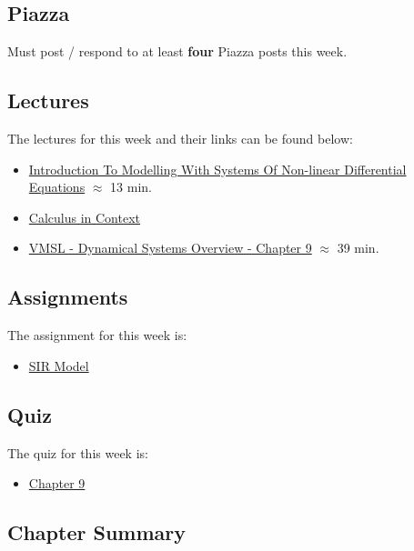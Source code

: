 \subsection{Piazza}

Must post / respond to at least \textbf{four} Piazza posts this week.

\subsection{Lectures}

The lectures for this week and their links can be found below:

\begin{itemize}
    \item \href{https://applied.cs.colorado.edu/mod/hvp/view.php?id=50773}{Introduction To Modelling With Systems Of Non-linear Differential Equations} $\approx$ 13 min.
    \item \href{https://scholarworks.smith.edu/textbooks/2/}{Calculus in Context}
    \item \href{https://www.youtube.com/watch?v=NS0jvPLtgGc}{VMSL - Dynamical Systems Overview - Chapter 9} $\approx$ 39 min.
\end{itemize}

\subsection{Assignments}

The assignment for this week is:

\begin{itemize}
    \item \href{https://github.com/QuantumCompiler/CU/tree/main/CSPB%202820%20-%20Linear%20Algebra%20With%20Computer%20Science%20Applications/CSPB%202820%20-%20Assignments/CSPB%202820%20-%20Assignment%209%20-%20SIR%20Model}{SIR Model}
\end{itemize}

\subsection{Quiz}

The quiz for this week is:

\begin{itemize}
    \item \href{https://applied.cs.colorado.edu/mod/quiz/view.php?id=50777}{Chapter 9}
\end{itemize}

\subsection{Chapter Summary}

